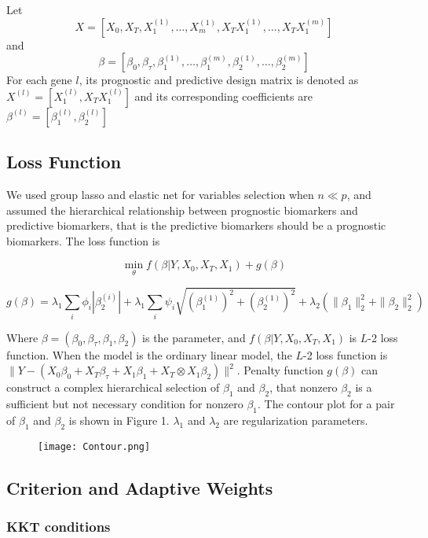 \documentclass[12pt]{article}
\begin{document}
Let $$X=[X_0,X_T,X_1^{(1)},\dots,X_m^{(1)},X_TX_1^{(1)},\dots,X_TX_1^{(m)}]$$ and $$\beta=[\beta_0,\beta_\tau,\beta_1^{(1)},\dots,\beta_1^{(m)},\beta_2^{(1)},\dots,\beta_2^{(m)}]$$ For each gene $l$, its prognostic and predictive design matrix is denoted as $X^{(l)}=[X_1^{(l)},X_TX_1^{(l)}]$ and its corresponding coefficients are $\beta^{(l)}=[\beta_1^{(l)},\beta_2^{(l)}]$

\subsection*{Loss Function}

We used group lasso and elastic net for variables selection when $n\ll p$, and assumed the hierarchical relationship between prognostic biomarkers and predictive biomarkers, that is the predictive biomarkers should be a prognostic biomarkers. The loss function is 

$$\min_{\theta} f(\beta|Y,X_0,X_T,X_1) + g(\beta)$$

$$g(\beta)=\lambda_1\sum_i\phi_i|\beta_2^{(i)}|+\lambda_1\sum_i\psi_i\sqrt{(\beta_1^{(1)})^2+(\beta_2^{(1)})^2}+\lambda_2(\parallel\beta_1\parallel_2^2+\parallel\beta_2\parallel_2^2)$$

Where $\beta=(\beta_0,\beta_\tau,\beta_1,\beta_2)$ is the parameter, and $f(\beta|Y,X_0,X_T,X_1) $ is $L$-2 loss function. When the model is the ordinary linear model, the $L$-2 loss function is $\parallel Y-(X_0\beta_0 + X_T\beta_\tau + X_1\beta_1+ X_T\otimes X_1 \beta_2) \parallel^2$. Penalty function $g(\beta)$ can construct a complex hierarchical selection of $\beta_1$ and $\beta_2$, that nonzero $\beta_2$ is a sufficient but not necessary condition for nonzero $\beta_1$. The contour plot for a pair of $\beta_1$ and $\beta_2$ is shown in Figure 1. $\lambda_1$ and $\lambda_2$ are regularization parameters.

\begin{figure}[t]
\texttt{[image: Contour.png]}
\centering
\end{figure}


\subsection*{Criterion and Adaptive Weights} 

\subsubsection*{KKT conditions}
\end{document}
